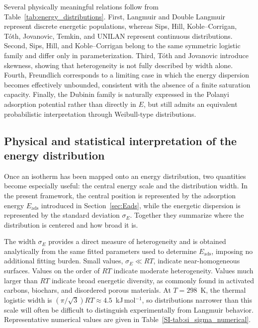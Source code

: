\documentclass[journal=jacsat,manuscript=article]{achemso}
\begin{document}
	Several physically meaningful relations follow from Table~\ref{tab:energy_distributions}. First, Langmuir and Double Langmuir represent discrete energetic populations, whereas Sips, Hill, Koble--Corrigan, T\'{o}th, Jovanovic, Temkin, and UNILAN represent continuous distributions. Second, Sips, Hill, and Koble--Corrigan belong to the same symmetric logistic family and differ only in parameterization. Third, T\'{o}th and Jovanovic introduce skewness, showing that heterogeneity is not fully described by width alone. Fourth, Freundlich corresponds to a limiting case in which the energy dispersion becomes effectively unbounded, consistent with the absence of a finite saturation capacity. Finally, the Dubinin family is naturally expressed in the Polanyi adsorption potential rather than directly in $E$, but still admits an equivalent probabilistic interpretation through Weibull-type distributions.
	
	\subsection{Physical and statistical interpretation of the energy distribution}
	\label{sec:sigma_E}
	
	Once an isotherm has been mapped onto an energy distribution, two quantities become especially useful: the central energy scale and the distribution width. In the present framework, the central position is represented by the adsorption energy $E_{\mathrm{ads}}$ introduced in Section~\ref{sec:Eads}, while the energetic dispersion is represented by the standard deviation $\sigma_E$. Together they summarize where the distribution is centered and how broad it is.
	
	The width $\sigma_E$ provides a direct measure of heterogeneity and is obtained analytically from the same fitted parameters used to determine $E_{\mathrm{ads}}$, imposing no additional fitting burden. Small values, $\sigma_E \ll RT$, indicate near-homogeneous surfaces. Values on the order of $RT$ indicate moderate heterogeneity. Values much larger than $RT$ indicate broad energetic diversity, as commonly found in activated carbons, biochars, and disordered porous materials. At $T=298$~K, the thermal logistic width is $(\pi/\sqrt{3})RT \approx 4.5$~kJ\,mol$^{-1}$, so distributions narrower than this scale will often be difficult to distinguish experimentally from Langmuir behavior. Representative numerical values are given in Table~\ref{SI-tab:si_sigma_numerical}.
\end{document}
